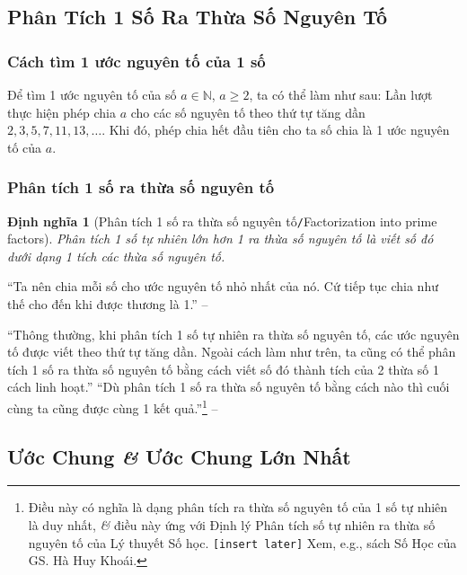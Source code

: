 \documentclass{article}
\numberwithin{equation}{section}
\newtheorem{dinhnghia}{Định nghĩa}[section]
\begin{document}

\subsection{Phân Tích 1 Số Ra Thừa Số Nguyên Tố}

\subsubsection{Cách tìm 1 ước nguyên tố của 1 số}
\begin{tcolorbox}
	Để tìm 1 ước nguyên tố của số $a\in\mathbb{N}$, $a\ge 2$, ta có thể làm như sau: Lần lượt thực hiện phép chia $a$ cho các số nguyên tố theo thứ tự tăng dần $2,3,5,7,11,13,\ldots$. Khi đó, phép chia hết đầu tiên cho ta số chia là 1 ước nguyên tố của $a$.
\end{tcolorbox}

\subsubsection{Phân tích 1 số ra thừa số nguyên tố}

\begin{dinhnghia}[Phân tích 1 số ra thừa số nguyên tố\texttt{/}Factorization into prime factors]
	\emph{Phân tích 1 số tự nhiên lớn hơn 1 ra thừa số nguyên tố} là viết số đó dưới dạng 1 tích các thừa số nguyên tố.
\end{dinhnghia}
``Ta nên chia mỗi số cho ước nguyên tố nhỏ nhất của nó. Cứ tiếp tục chia như thế cho đến khi được thương là 1.'' -- \cite[p. 45]{SGK_Toan_6_Canh_Dieu_tap_1}

``Thông thường, khi phân tích 1 số tự nhiên ra thừa số nguyên tố, các ước nguyên tố được viết theo thứ tự tăng dần. Ngoài cách làm như trên, ta cũng có thể phân tích 1 số ra thừa số nguyên tố bằng cách viết số đó thành tích của 2 thừa số 1 cách linh hoạt.'' ``Dù phân tích 1 số ra thừa số nguyên tố bằng cách nào thì cuối cùng ta cũng được cùng 1 kết quả.''\footnote{Điều này có nghĩa là dạng phân tích ra thừa số nguyên tố của 1 số tự nhiên là duy nhất, \textit{\&} điều này ứng với Định lý Phân tích số tự nhiên ra thừa số nguyên tố của Lý thuyết Số học. \texttt{[insert later]} Xem, e.g., sách Số Học của GS. Hà Huy Khoái.} -- \cite[p. 46]{SGK_Toan_6_Canh_Dieu_tap_1}


\subsection{Ước Chung \textit{\&} Ước Chung Lớn Nhất}
\end{document}
